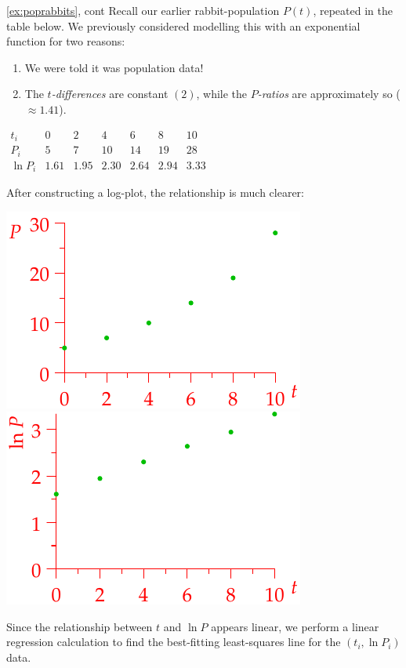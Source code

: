 \begin{example*}{\ref{ex:poprabbits}, cont}{}
	Recall our earlier rabbit-population $P(t)$, repeated in the table below. We previously considered modelling this with an exponential function for two reasons:\par
	\begin{minipage}[t]{0.55\linewidth}\vspace{-6pt}
		\begin{enumerate}\itemsep0pt
		  \item We were told it was population data!
		  \item The \emph{$t$-differences} are constant $(2)$, while the \emph{$P$-ratios} are approximately so ($\approx 1.41$).
		\end{enumerate}
	\end{minipage}
	\hfill
	\begin{minipage}[t]{0.44\linewidth}\vspace{0pt}
		\flushright $\begin{array}{c|cccccc}
			t_i&0&2&4&6&8&10\\\hline
			P_i&5&7&10&14&19&28\\\hline\hline
			\ln P_i&1.61&1.95&2.30&2.64&2.94&3.33
		\end{array}$
		\end{minipage}\medbreak
		After constructing a log-plot, the relationship is much clearer:
		\begin{center}
			\includegraphics{rabbits3}
			\qquad\qquad
			\includegraphics{rabbits4}
		\end{center}
		Since the relationship between $t$ and $\ln P$ appears linear, we perform a linear regression calculation to find the best-fitting least-squares line for the $(t_i,\ln P_i)$ data.\par
		

\end{example*}
